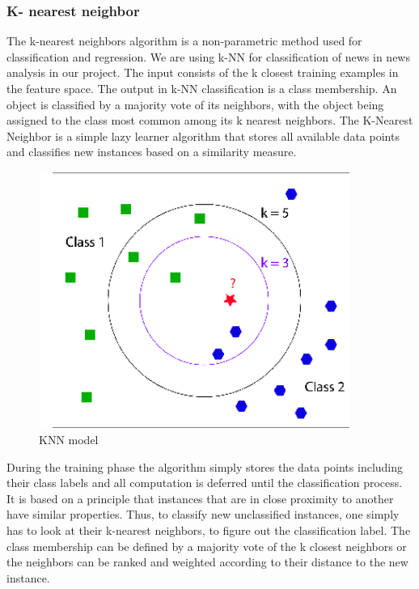 \subsubsection{K- nearest neighbor}
The k-nearest neighbors algorithm is a non-parametric method used for classification and regression. We are using k-NN for classification of news in news  analysis in our project. The input consists of the k closest training examples in the feature space. The output in k-NN classification is a class membership. An object is classified by a majority vote of its neighbors, with the object being assigned to the class most common among its k nearest neighbors. The K-Nearest Neighbor  is a simple lazy learner algorithm that stores all available data points  and classifies new instances based on a similarity measure.

\begin{figure}[h!]\centering
	
	\includegraphics[width=4in]{fig/KNN}
  \caption{KNN model}\label{fig:KNN}

    \end{figure}
    
During the training phase the algorithm simply stores the data points including their class labels and all computation is deferred until the classification process. It is based on a principle that instances that are in close proximity to another have similar properties. Thus, to classify new unclassified instances, one simply has to look at their k-nearest neighbors, to figure out  the classification label. The class membership can be defined by a majority vote of the k closest neighbors or the neighbors can be ranked and weighted according to their distance to the new instance.

